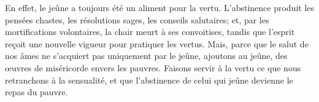 En effet, le jeûne a toujours été un aliment pour la vertu.
L’abstinence produit les pensées chastes,
	les résolutions sages, les conseils salutaires;
	et, par les mortifications volontaires, la chair meurt à ses convoitises,
	tandis que l’esprit reçoit une nouvelle vigueur pour pratiquer les vertus.
Mais, parce que le salut de nos âmes ne s’acquiert pas uniquement par le jeûne,
	ajoutons au jeûne, des œuvres de miséricorde envers les pauvres.
Faisons servir à la vertu ce que nous retranchons à la sensualité,
	et que l’abstinence de celui qui jeûne devienne le repas du pauvre.
